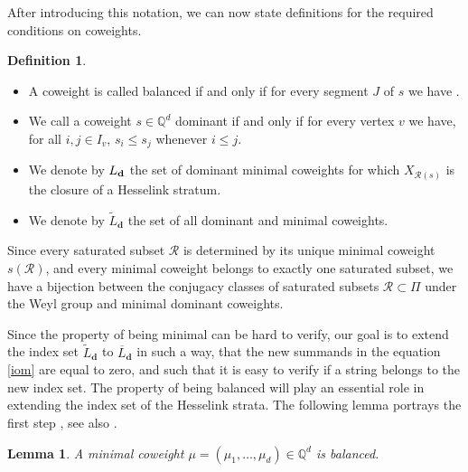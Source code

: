 \documentclass[pdftex]{sigma}
\newcommand{\R}{\mathcal{R}}
\numberwithin{equation}{section}
\newtheorem{Lemma}[Theorem]{Lemma}
\theoremstyle{definition}
\newtheorem{Definition}[Theorem]{Definition}
\begin{document}
After introducing this notation, we can now state definitions for the required conditions on coweights.
\begin{Definition} \label{baldom}\quad
\begin{itemize}\itemsep=0pt
\item[(a)] A coweight is called balanced if and only if for every segment $J$ of $s$ we have
.
\item[(b)] We call a coweight $s \in \mathbb{Q}^d$ dominant if and only if for every vertex $v$ we have, for all $i,j \in I_v$,
$
s_i \leq s_j $ whenever $ i\leq j $.
\item[(c)] We denote by $L_{\bf d}$ the set of dominant minimal coweights for which $X_{\R(s)}$ is the closure of a Hesselink stratum.

\item[(d)] We denote by $\widetilde{L}_{\mathbf{d}}$ the set of all dominant and minimal coweights.
\end{itemize}
\end{Definition}

Since every saturated subset $\R$ is determined by its unique minimal coweight $s(\R)$, and every minimal coweight belongs to exactly one saturated subset, we have a bijection between the conjugacy classes of saturated subsets $\R \subset \Pi$ under the Weyl group and minimal dominant coweights.

Since the property of being minimal can be hard to verify, our goal is to extend the index set $\widetilde{L}_{\mathbf{d}}$ to $\overline{L}_{\mathbf{d}}$ in such a way, that the new summands in the equation \eqref{iom} are equal to zero, and such that it is easy to verify if a string belongs to the new index set. The property of being balanced will play an essential role in extending the index set of the Hesselink strata. The following lemma portrays the first step \cite{LB}, see also \cite{Hesse}.

\begin{Lemma}
A minimal coweight $\mu = (\mu_1, \dots, \mu_d) \in \mathbb{Q}^d$ is balanced.
\end{Lemma}
\end{document}
